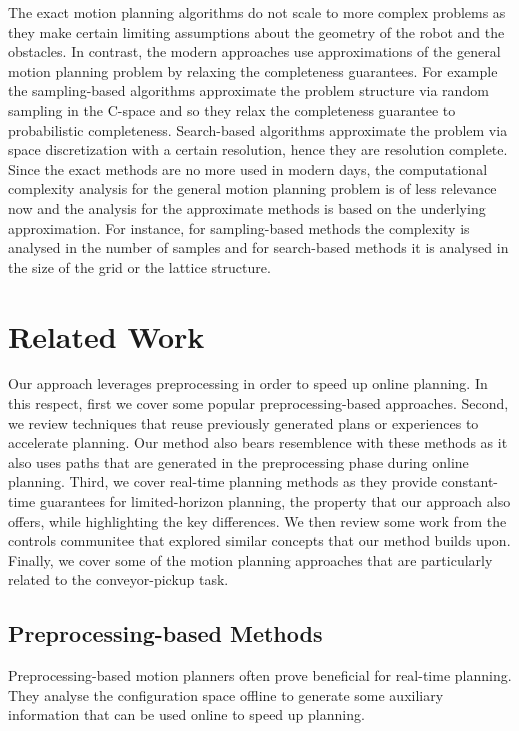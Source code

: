 \documentclass[a4paper]{report}
\begin{document}
The exact motion planning algorithms do not scale to more complex problems as they make certain limiting assumptions about the geometry of the robot and the obstacles. In contrast, the modern approaches use approximations of the general motion planning problem by relaxing the completeness guarantees. For example the sampling-based algorithms approximate the problem structure via random sampling in the C-space and so they relax the completeness guarantee to probabilistic completeness. Search-based algorithms approximate the problem via space discretization with a certain resolution, hence they are resolution complete.
Since the exact methods are no more used in modern days, the computational complexity analysis for the general motion planning problem is of less relevance now and the analysis for the approximate methods is based on the underlying approximation. For instance, for sampling-based methods the complexity is analysed in the number of samples and for search-based methods it is analysed in the size of the grid or the lattice structure.


\newpage
\chapter{Related Work}
\label{sec:rel}
Our approach leverages preprocessing in order to speed up online planning. In this respect, first we cover some popular preprocessing-based approaches. Second, we review techniques that reuse previously generated plans or experiences to accelerate planning. Our method also bears resemblence with these methods as it also uses paths that are generated in the preprocessing phase during online planning. Third, we cover real-time planning methods as they provide constant-time guarantees for limited-horizon planning, the property that our approach also offers, while highlighting the key differences. We then review some work from the controls communitee that explored similar concepts that our method builds upon. Finally, we cover some of the motion planning approaches that are particularly related to the conveyor-pickup task.

\section{Preprocessing-based Methods}
Preprocessing-based motion planners often prove beneficial for real-time planning. They analyse the configuration space offline to generate some auxiliary information that can be used online to speed up planning. 
\end{document}
